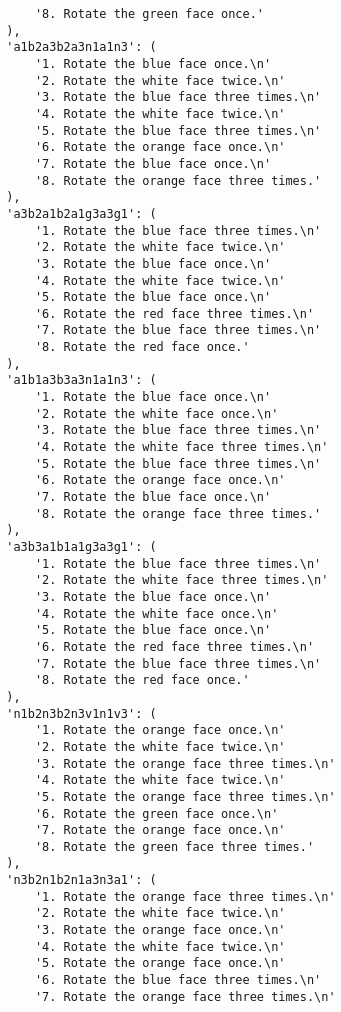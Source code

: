 \begin{lstlisting}
            '8. Rotate the green face once.'
        ),
        'a1b2a3b2a3n1a1n3': (
            '1. Rotate the blue face once.\n'
            '2. Rotate the white face twice.\n'
            '3. Rotate the blue face three times.\n'
            '4. Rotate the white face twice.\n'
            '5. Rotate the blue face three times.\n'
            '6. Rotate the orange face once.\n'
            '7. Rotate the blue face once.\n'
            '8. Rotate the orange face three times.'
        ),
        'a3b2a1b2a1g3a3g1': (
            '1. Rotate the blue face three times.\n'
            '2. Rotate the white face twice.\n'
            '3. Rotate the blue face once.\n'
            '4. Rotate the white face twice.\n'
            '5. Rotate the blue face once.\n'
            '6. Rotate the red face three times.\n'
            '7. Rotate the blue face three times.\n'
            '8. Rotate the red face once.'
        ),
        'a1b1a3b3a3n1a1n3': (
            '1. Rotate the blue face once.\n'
            '2. Rotate the white face once.\n'
            '3. Rotate the blue face three times.\n'
            '4. Rotate the white face three times.\n'
            '5. Rotate the blue face three times.\n'
            '6. Rotate the orange face once.\n'
            '7. Rotate the blue face once.\n'
            '8. Rotate the orange face three times.'
        ),
        'a3b3a1b1a1g3a3g1': (
            '1. Rotate the blue face three times.\n'
            '2. Rotate the white face three times.\n'
            '3. Rotate the blue face once.\n'
            '4. Rotate the white face once.\n'
            '5. Rotate the blue face once.\n'
            '6. Rotate the red face three times.\n'
            '7. Rotate the blue face three times.\n'
            '8. Rotate the red face once.'
        ),
        'n1b2n3b2n3v1n1v3': (
            '1. Rotate the orange face once.\n'
            '2. Rotate the white face twice.\n'
            '3. Rotate the orange face three times.\n'
            '4. Rotate the white face twice.\n'
            '5. Rotate the orange face three times.\n'
            '6. Rotate the green face once.\n'
            '7. Rotate the orange face once.\n'
            '8. Rotate the green face three times.'
        ),
        'n3b2n1b2n1a3n3a1': (
            '1. Rotate the orange face three times.\n'
            '2. Rotate the white face twice.\n'
            '3. Rotate the orange face once.\n'
            '4. Rotate the white face twice.\n'
            '5. Rotate the orange face once.\n'
            '6. Rotate the blue face three times.\n'
            '7. Rotate the orange face three times.\n'

\end{lstlisting}

